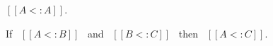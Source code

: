 
\begin{lemma}
  $[[A <: A]]$.
\label{lemma:union:refl}
\end{lemma}
\begin{comment}
\begin{proof}
  By induction on type A. All cases are trivial to prove.
\end{proof}
\end{comment}
\begin{lemma}
  If \ $[[A <: B]]$ \ and \ $[[B <: C]]$ \ then \ $[[A <: C]]$.
  \label{lemma:union:trans}
\end{lemma}
\begin{comment}
\begin{proof}
  By induction on type B.
  \begin{itemize}
    \item Cases $[[Top]]$, $[[Bot]]$ and $[[Int]]$ are trivial to prove.
    \item Case $[[A -> B]]$ requires double induction on type $[[C]]$
          and $[[A]]$.
    \item Case $[[A \/ B]]$ requires \Cref{lemma:union:sub-or}
  \end{itemize}
\end{proof}\bruno{If space is a concern we can probably drop the lemma statements
for reflexivity and transitivity as these are quite standard.}

\begin{lemma}[Subtyping Union Inversion]
\label{lemma:union:sub-or}
  If \ $[[A \/ B <: C]]$ then:
  \begin{enumerate}
    \item $[[A <: C]]$ and
    \item $[[B <: C]]$
  \end{enumerate}
\end{lemma}
\end{comment}


